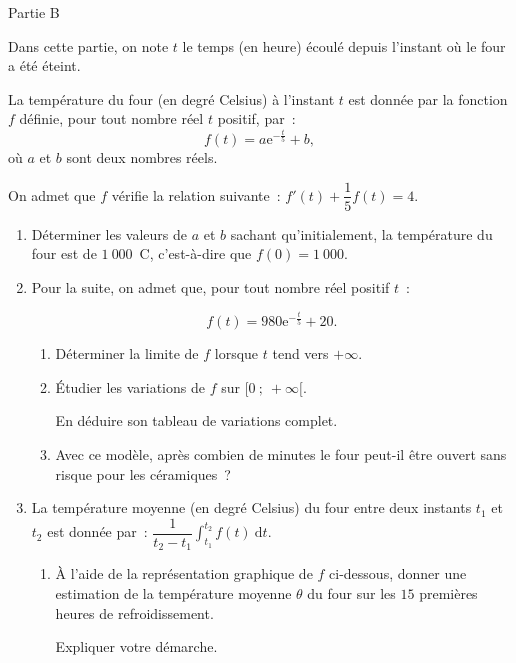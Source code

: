 \begin{center}\begin{h3}Partie B \end{h3}\end{center}
Dans cette partie, on note $t$ le temps (en heure) écoulé depuis l'instant où le four a été éteint.
\par
La température du four (en degré Celsius) à l'instant $t$ est donnée par la fonction $f$ définie,
pour tout nombre réel $t$ positif, par~:
\[f(t) = a\text{e}^{- \frac{t}{5}} + b,\]
où $a$ et $b$ sont deux nombres réels.
\par
On admet que $f$ vérifie la relation suivante~: $f'(t) + \dfrac{1}{5}f(t) = 4$.
\medskip
\begin{enumerate}
     \item Déterminer les valeurs de $a$ et $b$ sachant qu'initialement, la température du four est de
     $1~000$~\degres C, c'est-à-dire que $f(0) = 1~000$.
     \item  Pour la suite, on admet que, pour tout nombre réel positif $t$~:
     \par
     \[f(t) = 980\text{e}^{- \frac{t}{5}} + 20.\]
     \begin{enumerate}[label=\alph*.]
          \item Déterminer la limite de $f$ lorsque $t$ tend vers $+ \infty$.
          \item Étudier les variations de $f$ sur $[0~;~+ \infty[$.
          \par
          En déduire son tableau de variations complet.
          \item Avec ce modèle, après combien de minutes le four peut-il être ouvert sans risque pour
          les céramiques~?
     \end{enumerate}
     \item  La température moyenne (en degré Celsius) du four entre deux instants $t_1$ et $t_2$ est donnée
     par~: $\dfrac{1}{t_2 - t_1}\displaystyle\int_{t_1}^{t_2} f(t)\:\text{d}t$.
     \begin{enumerate}[label=\alph*.]
          \item À l'aide de la représentation graphique de $f$ ci-dessous, donner une estimation de la
          température moyenne $\theta$ du four sur les $15$ premières heures de refroidissement.
          \par
          Expliquer votre démarche.
          \begin{center}
               \begin{extern}%

\end{extern}
\end{center}
\end{enumerate}
\end{enumerate}
